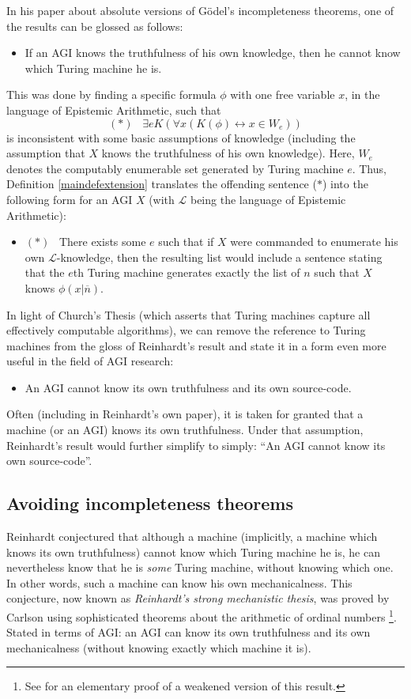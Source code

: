 \documentclass[runningheads]{llncs}
\begin{document}
In his paper \cite{reinhardt1985absolute} about absolute versions of
G\"odel's incompleteness theorems, one of the results can be glossed as follows:
\begin{itemize}
  \item
  If an AGI knows the truthfulness of his own knowledge, then he cannot
  know which Turing machine he is.
\end{itemize}
This was done by finding a specific formula $\phi$ with one free variable $x$,
in the language of Epistemic Arithmetic,
such that
\[
  (*) \,\,\,\,\, \exists e K(\forall x (K(\phi)\leftrightarrow x\in W_e))
\]
is inconsistent with some basic assumptions of knowledge
(including the assumption that $X$ knows the truthfulness of his own knowledge).
Here, $W_e$ denotes the computably enumerable set generated by Turing machine $e$. Thus,
Definition \ref{maindefextension} translates the offending sentence ($*$) into the
following form
for an AGI $X$ (with $\mathscr L$ being the language of Epistemic Arithmetic):
\begin{itemize}
  \item
  $(*) \,\,\,\,\, $There exists some $e$ such that if $X$ were commanded to enumerate his own
  $\mathscr L$-knowledge, then the resulting list would include a sentence
  stating that the $e$th Turing machine generates exactly the list of $n$ such
  that $X$ knows $\phi(x|\overline n)$.
\end{itemize}

In light of Church's Thesis (which asserts that Turing machines capture all
effectively computable algorithms), we can remove the reference to Turing machines
from the gloss of Reinhardt's result and state it in a form even more useful
in the field of AGI research:
\begin{itemize}
  \item
  An AGI cannot know its own truthfulness and its own source-code.
\end{itemize}

Often (including in Reinhardt's own paper), it is taken for granted that
a machine (or an AGI) knows its own truthfulness.
Under that assumption, Reinhardt's result would further simplify to
simply: ``An AGI cannot know its own source-code''.

\subsection{Avoiding incompleteness theorems}

Reinhardt conjectured that although a machine (implicitly, a machine which
knows its own truthfulness) cannot know which Turing machine he is, he can
nevertheless know that he is \emph{some} Turing machine, without knowing
which one. In other words, such a machine can know his own mechanicalness.
This conjecture, now known as \emph{Reinhardt's strong mechanistic thesis}, was
proved by Carlson \cite{carlson} using sophisticated theorems about the
arithmetic of ordinal numbers \cite{carlson1999}\footnote{See
\cite{alexander2015fast} for an elementary proof of a weakened version of
this result.}. Stated in terms of AGI: an AGI can know its own truthfulness
and its own mechanicalness (without knowing exactly which machine it is).
\end{document}
